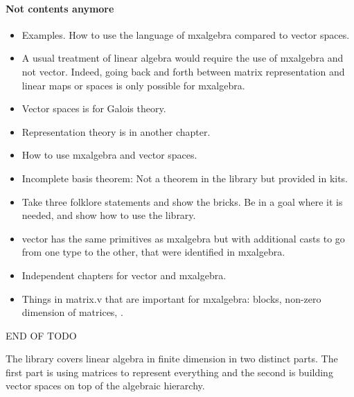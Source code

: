 \paragraph{Not contents anymore}
\begin{itemize}
\item Examples. How to use the language of mxalgebra compared to
  vector spaces.

\item   A usual treatment of linear algebra would require the use of
  mxalgebra and not vector. Indeed, going back and forth between
  matrix representation and linear maps or spaces is only possible for
  mxalgebra.

\item   Vector spaces is for Galois theory.

\item   Representation theory is in another chapter.

\item   How to use mxalgebra and vector spaces.

\item Incomplete basis theorem: Not a theorem in the library but provided
  in kits.

\item   Take three folklore statements and show the bricks. Be in a goal
  where it is needed, and show how to use the library.


\item   vector has the same primitives as mxalgebra but with additional
  casts to go from one type to the other, that were identified in
  mxalgebra.


\item   Independent chapters for vector and mxalgebra.

\item   Things in matrix.v that are important for mxalgebra: blocks,
  non-zero dimension of matrices, .

\end{itemize}
END OF TODO








The library covers linear algebra in finite dimension in two distinct
parts. The first part is using matrices to represent everything and
the second is building vector spaces on top of the algebraic
hierarchy.



\newcommand{\idmat}{\ensuremath{\mathbb{I}}}

